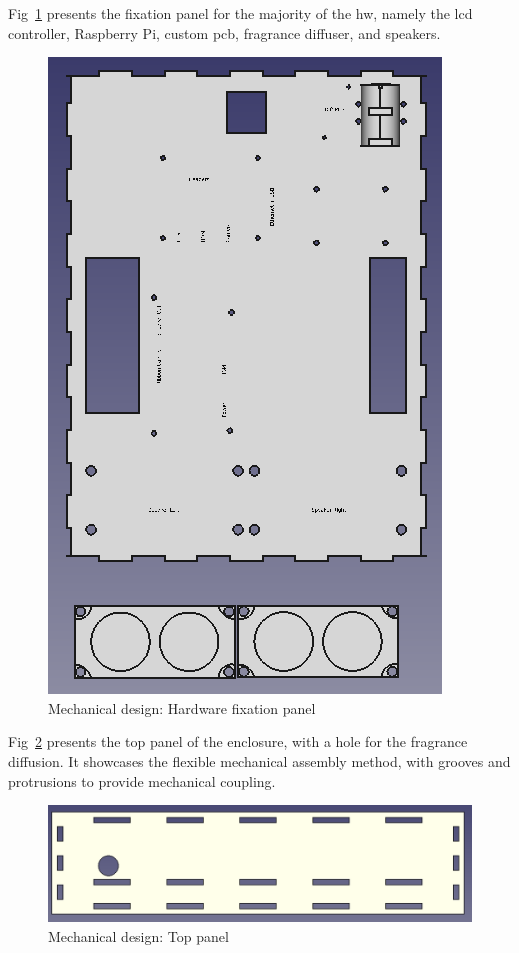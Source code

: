 Fig~\ref{fig:mech-design-hw} presents the fixation panel for the majority of the
\gls{hw}, namely the \gls{lcd} controller, Raspberry Pi, custom \gls{pcb},
fragrance diffuser, and speakers.
% 
\begin{figure}[htb!]
\centering
    \includegraphics[width=0.6\columnwidth]{./img/mech-design-hw.png}
  \caption{Mechanical design: Hardware fixation panel}%
\label{fig:mech-design-hw}
\end{figure}

Fig~\ref{fig:mech-design-top} presents the top panel of the enclosure,
with a hole for the fragrance diffusion. It showcases the flexible mechanical
assembly method, with grooves and protrusions to provide mechanical coupling.
% 
\begin{figure}[htb!]
\centering
    \includegraphics[width=0.6\columnwidth]{./img/mech-design-top.png}
  \caption{Mechanical design: Top panel}%
\label{fig:mech-design-top}
\end{figure}



